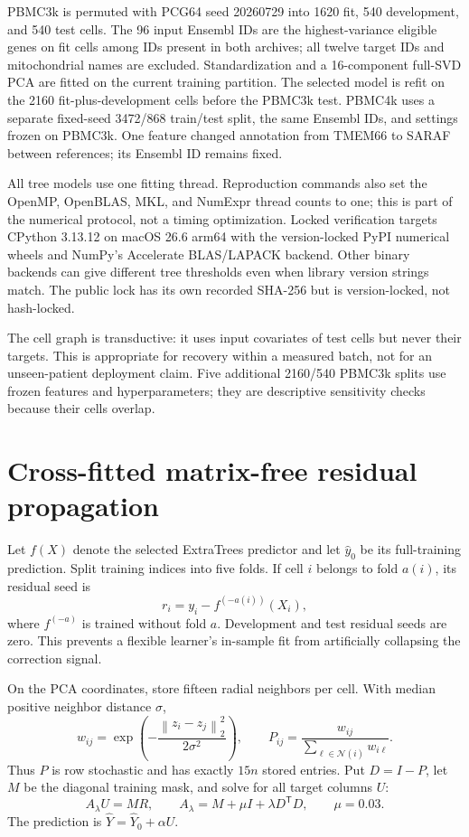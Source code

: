 \documentclass[10pt,letterpaper,twoside]{article}
\newcommand{\norm}[1]{\left\lVert #1\right\rVert}
\newcommand{\trans}{\mathsf T}
\begin{document}
PBMC3k is permuted with PCG64 seed 20260729 into 1620 fit, 540 development,
and 540 test cells.  The 96 input Ensembl IDs are the highest-variance eligible
genes on fit cells among IDs present in both archives; all twelve target IDs and
mitochondrial names are excluded.  Standardization and a 16-component full-SVD
PCA are fitted on the current training partition.  The selected model is refit
on the 2160 fit-plus-development cells before the PBMC3k test.  PBMC4k uses a
separate fixed-seed 3472/868 train/test split, the same Ensembl IDs, and settings
frozen on PBMC3k.  One feature changed annotation from TMEM66 to SARAF between
references; its Ensembl ID remains fixed.

All tree models use one fitting thread.  Reproduction commands also set the
OpenMP, OpenBLAS, MKL, and NumExpr thread counts to one; this is part of the
numerical protocol, not a timing optimization.  Locked verification targets
CPython 3.13.12 on macOS 26.6 arm64 with the version-locked PyPI numerical
wheels and NumPy's Accelerate BLAS/LAPACK backend.  Other binary backends can
give different tree thresholds even when library version strings match.  The
public lock has its own recorded SHA-256 but is version-locked, not hash-locked.

The cell graph is transductive: it uses input covariates of test cells but never
their targets.  This is appropriate for recovery within a measured batch, not
for an unseen-patient deployment claim.  Five additional 2160/540 PBMC3k splits
use frozen features and hyperparameters; they are descriptive sensitivity
checks because their cells overlap.

\section{Cross-fitted matrix-free residual propagation}

Let $f(X)$ denote the selected ExtraTrees predictor and let $\widehat y_0$ be
its full-training prediction.  Split training indices into five folds.  If cell
$i$ belongs to fold $a(i)$, its residual seed is
\begin{equation}
 r_i=y_i-f^{(-a(i))}(X_i),
\label{eq:oof}
\end{equation}
where $f^{(-a)}$ is trained without fold $a$.  Development and test residual
seeds are zero.  This prevents a flexible learner's in-sample fit from
artificially collapsing the correction signal.

On the PCA coordinates, store fifteen radial neighbors per cell.  With median
positive neighbor distance $\sigma$,
\begin{equation}
 w_{ij}=\exp\left(-\frac{\norm{z_i-z_j}_2^2}{2\sigma^2}\right),\qquad
 P_{ij}=\frac{w_{ij}}{\sum_{\ell\in\mathcal N(i)}w_{i\ell}}.
\end{equation}
Thus $P$ is row stochastic and has exactly $15n$ stored entries.  Put
$D=I-P$, let $M$ be the diagonal training mask, and solve for all target
columns $U$:
\begin{equation}
 A_\lambda U=MR,\qquad
 A_\lambda=M+\mu I+\lambda D^\trans D,\qquad \mu=0.03.
\label{eq:system}
\end{equation}
The prediction is $\widehat Y=\widehat Y_0+\alpha U$.
\end{document}
